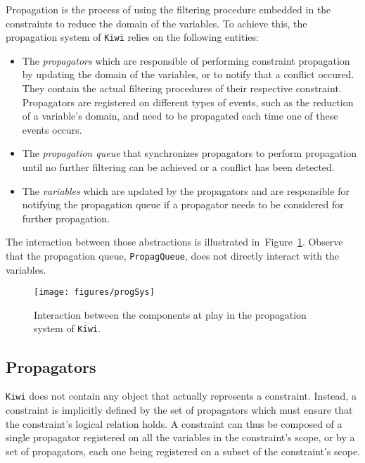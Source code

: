 \documentclass{llncs}
\newcommand{\fig}[1]{Figure~\ref{fig:#1}}
\begin{document}
Propagation is the process of using the filtering procedure embedded in the constraints to reduce the domain of the variables. 
To achieve this, the propagation system of \texttt{Kiwi} relies on the following entities: 
%
\begin{itemize}

  \item The \emph{propagators} which are responsible of performing constraint propagation by updating the domain of the variables, or to notify that a conflict occured. They contain the actual filtering procedures of their respective constraint. Propagators are registered on different types of events, such as the reduction of a variable's domain, and need to be propagated each time one of these events occurs.  
  \item The \emph{propagation queue} that synchronizes propagators to perform propagation until no further filtering can be achieved or a conflict has been detected.

  \item The \emph{variables} which are updated by the propagators and are responsible for notifying the propagation queue if a propagator needs to be considered for further propagation. 
\end{itemize}

\noindent
The interaction between those abstractions is illustrated in~\fig{propagSys}. Observe that the propagation queue, \texttt{PropagQueue}, does not directly interact with the variables. 

\begin{figure}
    \centering
    \texttt{[image: figures/progSys]}
    \caption{Interaction between the components at play in the propagation system of \texttt{Kiwi}.}
    \label{fig:propagSys}
\end{figure}

\subsection{Propagators}

\texttt{Kiwi} does not contain any object that actually represents a constraint. 
Instead, a constraint is implicitly defined by the set of propagators which must ensure that the constraint's logical relation holds. 
A constraint can thus be composed of a single propagator registered on all the variables in the constraint's scope, or by a set of propagators, each one being registered on a subset of the constraint's scope.
\end{document}
